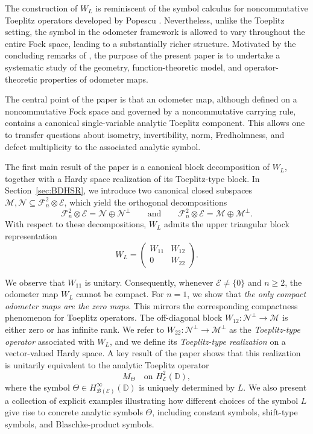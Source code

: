 \documentclass[12pt]{amsart}
\theoremstyle{definition}
\theoremstyle{remark}
\def \D{\mathbb{D}}
\newcommand{\clb}{\mathcal{B}}
\newcommand{\cle}{\mathcal{E}}
\newcommand{\clm}{\mathcal{M}}
\newcommand{\cln}{\mathcal{N}}
\newcommand{\clf}{\mathcal{F}}
\numberwithin{equation}{section}
\begin{document}
The construction of $W_L$ is reminiscent of the symbol calculus for noncommutative Toeplitz operators developed by Popescu \cite{popescu}. Nevertheless, unlike the Toeplitz setting, the symbol in the odometer framework
is allowed to vary throughout the entire Fock space, leading to a substantially
richer structure. Motivated by the concluding remarks of \cite{mansi2025}, the purpose of the present paper is to undertake a systematic study of the geometry, function-theoretic model, and operator-theoretic properties of odometer maps.

The central point of the paper is that an odometer map, although defined on
a noncommutative Fock space and governed by a noncommutative carrying rule,
contains a canonical single-variable analytic Toeplitz component. This
allows one to transfer questions about isometry, invertibility, norm,
Fredholmness, and defect multiplicity to the associated analytic symbol.

The first main result of the paper is a canonical block decomposition of
\(W_L\), together with a Hardy space realization of its Toeplitz-type block. In Section~\ref{sec:BDHSR}, we introduce two canonical closed subspaces
\(\clm, \cln \subseteq \clf_n^2\otimes\cle\), which yield the orthogonal
decompositions
\[
\clf_n^2\otimes\cle=\cln\oplus\cln^\perp
\qquad\text{and}\qquad
\clf_n^2\otimes\cle=\clm\oplus\clm^\perp.
\]
With respect to these decompositions, \(W_L\) admits the upper triangular block
representation
\[
W_L=
\begin{pmatrix}
W_{11} & W_{12}\\
0 & W_{22}
\end{pmatrix}.
\]

We observe that $W_{11}$ is unitary. Consequently, whenever
$\cle\neq\{0\}$ and $n\geq 2$, the odometer map $W_L$ cannot be compact. For $n=1$, we show that \emph{the only compact odometer maps are the zero maps}. This mirrors the corresponding compactness phenomenon for Toeplitz operators. The off-diagonal block $W_{12}:\cln^\perp\to \clm$  is either zero or has infinite rank. We refer to $W_{22}:\cln^\perp\to \clm^\perp$ as the \emph{Toeplitz-type operator} associated with $W_L$, and we define its \emph{Toeplitz-type realization} on a vector-valued Hardy space. A key result of the paper shows that this realization is unitarily equivalent to the analytic Toeplitz operator
\[
M_\Theta \quad \text{on } H^2_{\cle}(\D),
\]
where the symbol $\Theta\in H^\infty_{\clb(\cle)}(\D)$
is uniquely determined by \(L\). We also present a collection of explicit examples illustrating how different choices of the symbol \(L\) give rise to concrete
analytic symbols \(\Theta\), including constant symbols, shift-type symbols, and Blaschke-product symbols. 
\end{document}
